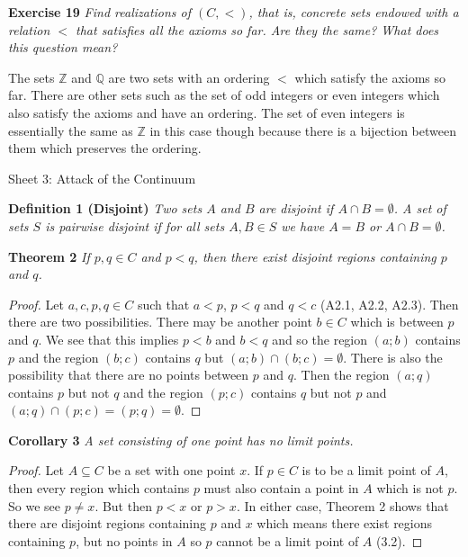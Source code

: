 \documentclass{article}
\begin{document}
\begin{flushleft}
\textbf{Exercise 19}
\textsl{Find realizations of $(C, <)$, that is, concrete sets endowed with a relation $<$ that satisfies all the axioms so far. Are they the same? What does this question mean?}\newline

The sets $\mathbb{Z}$ and $\mathbb{Q}$ are two sets with an ordering $<$ which satisfy the axioms so far. There are other sets such as the set of odd integers or even integers which also satisfy the axioms and have an ordering. The set of even integers is essentially the same as $\mathbb{Z}$ in this case though because there is a bijection between them which preserves the ordering.
\newpage

\Large

Sheet 3: Attack of the Continuum\newline

\normalsize

\textbf{Definition 1 (Disjoint)}
\textsl{Two sets $A$ and $B$ are disjoint if $A \cap B = \emptyset$. A set of sets $S$ is pairwise disjoint if for all sets $A,B \in S$ we have $A=B$ or $A \cap B = \emptyset$.}\newline

\textbf{Theorem 2}
\textsl{If $p,q \in C$ and $p<q$, then there exist disjoint regions containing $p$ and $q$.}
\begin{proof}
Let $a,c,p,q \in C$ such that $a<p$, $p<q$ and $q<c$ (A2.1, A2.2, A2.3). Then there are two possibilities. There may be another point $b \in C$ which is between $p$ and $q$. We see that this implies $p<b$ and $b<q$ and so the region $(a;b)$ contains $p$ and the region $(b;c)$ contains $q$ but $(a;b) \cap (b;c) = \emptyset$. There is also the possibility that there are no points between $p$ and $q$. Then the region $(a;q)$ contains $p$ but not $q$ and the region $(p;c)$ contains $q$ but not $p$ and $(a;q) \cap (p;c) = (p;q) = \emptyset$.
\end{proof}

\textbf{Corollary 3}
\textsl{A set consisting of one point has no limit points.}
\begin{proof}
Let $A \subseteq C$ be a set with one point $x$. If $p \in C$ is to be a limit point of $A$, then every region which contains $p$ must also contain a point in $A$ which is not $p$. So we see $p \neq x$. But then $p<x$ or $p>x$. In either case, Theorem 2 shows that there are disjoint regions containing $p$ and $x$ which means there exist regions containing $p$, but no points in $A$ so $p$ cannot be a limit point of $A$ (3.2).
\end{proof}


\end{flushleft}
\end{document}
